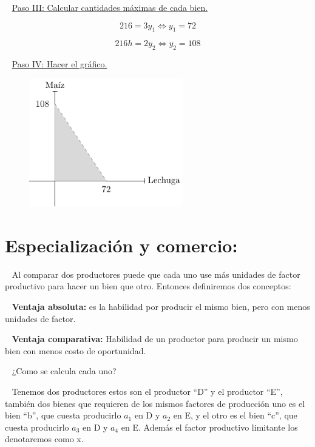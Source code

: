 \documentclass[
  letterpaper,
  DIV=11,
  numbers=noendperiod]{scrreport}
\begin{document}
\begin{tcolorbox}
~ \ul{Paso III: Calcular cantidades máximas de cada bien.}

\[
216=3y_1 \Leftrightarrow y_1=72
\]

\[
216h=2y_2 \Leftrightarrow y_2=108
\]

~ \ul{Paso IV: Hacer el gráfico.}

\begin{figure}[H]

{\centering \includegraphics[width=0.6\textwidth,height=\textheight]{intro_files/figure-pdf/unnamed-chunk-2-1.pdf}

}

\end{figure}

\end{tcolorbox}

\hypertarget{especializaciuxf3n-y-comercio}{%
\section{Especialización y
comercio:}\label{especializaciuxf3n-y-comercio}}

~ Al comparar dos productores puede que cada uno use más unidades de
factor productivo para hacer un bien que otro. Entonces definiremos dos
conceptos:

~ \textbf{Ventaja absoluta:} es la habilidad por producir el mismo bien,
pero con menos unidades de factor.

~ \textbf{Ventaja comparativa:} Habilidad de un productor para producir
un mismo bien con menos costo de oportunidad.

~ ¿Como se calcula cada uno?

~ Tenemos dos productores estos son el productor ``D'' y el productor
``E'', también dos bienes que requieren de los mismos factores de
producción uno es el bien ``b'', que cuesta producirlo \(a_1\) en D y
\(a_2\) en E, y el otro es el bien ``c'', que cuesta producirlo \(a_3\)
en D y \(a_4\) en E. Además el factor productivo limitante los
denotaremos como x.
\end{document}
